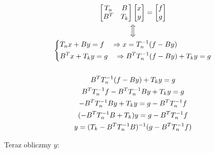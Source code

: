 \documentclass[a4paper]{article}
\newcommand{\Longupdownarrow}{\Big\Updownarrow}
\begin{document}
        \begin{gather*}
            \begin{bmatrix}
                  T_{n} & B \\
                  B^T & T_{k}
            \end{bmatrix}
            \begin{bmatrix}
                x \\
                y
            \end{bmatrix}
            =
            \begin{bmatrix}
                f \\
                g
            \end{bmatrix} \\
            \Longupdownarrow \\
            \begin{dcases}
                T_{n}x + By = f \quad \Rightarrow x = T_{n}^{-1}(f - By)  \\
                B^{T}x + T_{k}y = g \quad \Rightarrow B^{T}T_{n}^{-1}(f - By) + T_{k}y = g
            \end{dcases} \\ \\
            B^{T}T_{n}^{-1}(f - By) + T_{k}y = g \\
            B^{T}T_{n}^{-1}f - B^{T}T_{n}^{-1}By + T_{k}y = g \\
            - B^{T}T_{n}^{-1}By + T_{k}y = g - B^{T}T_{n}^{-1}f \\
            (-B^{T}T_{n}^{-1}B + T_{k})y = g - B^{T}T_{n}^{-1}f \\
            y = (T_{k} - B^{T}T_{n}^{-1}B)^{-1}(g - B^{T}T_{n}^{-1}f)\\
        \end{gather*}

        Teraz obliczmy $y$:
\end{document}
